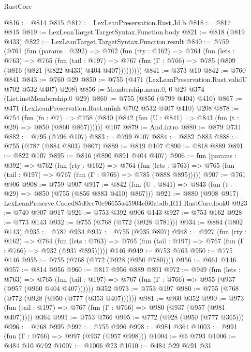 \begin{lexlean}{RustCore}
\begin{coremodule}
@816 := @814 @815
@817 := LexLeanPreservation.Rust.Jd.b
@818 := @817 @815
@819 := LexLeanTarget.TargetSyntax.Function.body
@821 := @818 (@819 @433)
@822 := LexLeanTarget.TargetSyntax.Function.result
@840 := @759
    (@761
      (fun (params : @392) =>
      @762
        (fun (rty : @162) =>
        @764
          (fun (lets : @763) =>
          @765
            (fun (tail : @197) =>
            @767 (fun (Γ : @766) => @785 (@809 (@816 (@821 (@822 @433) @404 @407)))))))))
@841 := @373 @10
@842 := @760 @841
@843 := @760 @29
@850 := @755 (@471 (LexLeanPreservation.Rust.validU @702 @532 @407) @208)
@856 := Membership.mem.{0, 0} @29 @374 (List.instMembership.{0} @29)
@860 := @755 (@856 (@799 @404) @410)
@867 := @471 (LexLeanPreservation.Rust.uninh @702 @532 @407 @410) @208
@878 := @754
    (fun (fn : @7) =>
    @758 (@840 (@842 (fun (U : @841) => @843 (fun (t : @29) => @850 (@860 @867))))))
    @107
@879 := And.intro
@880 := @879 @731
@882 := @795 (@796 @107)
@883 := @799 @107
@884 := @882 @883
@888 := @755 (@787 (@884 @803) @807)
@889 := @819 @107
@890 := @818 @889
@891 := @822 @107
@895 := @816 (@890 @891 @404 @407)
@906 := fun (params : @392) =>
  @762
    (fun (rty : @162) =>
    @764
      (fun (lets : @763) => @765 (fun (tail : @197) => @767 (fun (Γ : @766) => @785 (@888 @895)))))
@907 := @761 @906
@908 := @759 @907
@917 := @842 (fun (U : @841) => @843 (fun (t : @29) => @850 (@755 (@856 @883 @410) @867)))
@921 := @880 (@908 @917) LexLeanPreserve.Caded85d0ec70c96655a45904ef60abdb.R11.RustCore.look0
@923 := @740 @907 @917
@926 := @753 @392 @906 @143
@927 := @753 @162
@928 := @773 @143
@932 := @755 (@768 (@772 (@928 @781)))
@934 := @884 (@802 @143)
@935 := @787 @934
@937 := @755 (@935 @807)
@948 := @927
    (fun (rty : @162) =>
    @764
      (fun (lets : @763) => @765 (fun (tail : @197) => @767 (fun (Γ : @766) => @932 (@937 @895)))))
    @146
@949 := @753 @763
@950 := @775 @146
@955 := @755 (@768 (@772 (@928 (@950 @780))))
@956 := @661 @146
@957 := @814 @956
@960 := @817 @956 @889 @891
@972 := @949
    (fun (lets : @763) =>
    @765 (fun (tail : @197) => @767 (fun (Γ : @766) => @955 (@937 (@957 (@960 @404 @407))))))
    @352
@973 := @753 @197
@980 := @755 (@768 (@772 (@928 (@950 (@777 (@353 @407))))))
@981 := @960 @352
@990 := @973 (fun (tail : @197) => @767 (fun (Γ : @766) => @980 (@937 (@957 (@981 @407))))) @364
@991 := @753 @766
@995 := @772 (@928 (@950 (@777 @365)))
@996 := @768 @995
@997 := @755 @996
@998 := @981 @364
@1003 := @991 (fun (Γ : @766) => @997 (@937 (@957 @998)))
@1004 := @6 @793
@1006 := @484 @10 @792
@1007 := @1006 @23
@1010 := @484 @29 @791 @31

\end{coremodule}
\end{lexlean}
